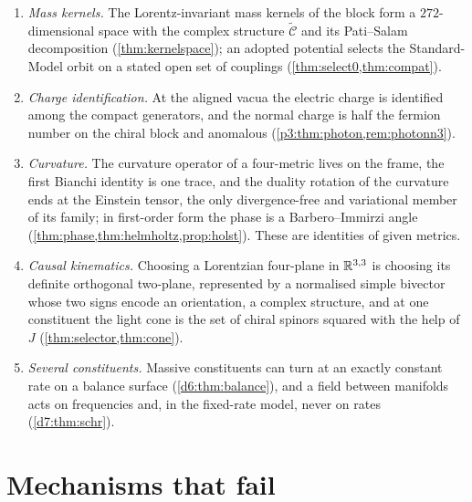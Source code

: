 \begin{enumerate}[label=(\arabic*),leftmargin=2.2em]
\item \emph{Mass kernels.} The Lorentz-invariant mass kernels of the block form a $272$-dimensional space with the complex structure $\widetilde{\mathcal C}$
and its Pati--Salam decomposition (\cref{thm:kernelspace}); an adopted potential selects the Standard-Model orbit on a stated open set of couplings
(\cref{thm:select0,thm:compat}).
\item \emph{Charge identification.} At the aligned vacua the electric charge is identified among the compact generators, and the normal charge is
half the fermion number on the chiral block and anomalous (\cref{p3:thm:photon,rem:photonn3}).
\item \emph{Curvature.} The curvature operator of a four-metric lives on the frame, the first Bianchi identity is one trace, and the duality
rotation of the curvature ends at the Einstein tensor, the only divergence-free and variational member of its family; in first-order form the
phase is a Barbero--Immirzi angle (\cref{thm:phase,thm:helmholtz,prop:holst}). These are identities of given metrics.
\item \emph{Causal kinematics.} Choosing a Lorentzian four-plane in $\mathbb{R}^{3,3}$ is choosing its definite orthogonal two-plane, represented by a
normalised simple bivector whose two signs encode an orientation, a complex structure, and at one constituent the light
cone is the set of chiral spinors squared with the help of $J$ (\cref{thm:selector,thm:cone}).
\item \emph{Several constituents.} Massive constituents can turn at an exactly constant rate on a balance surface (\cref{d6:thm:balance}), and a
field between manifolds acts on frequencies and, in the fixed-rate model, never on rates (\cref{d7:thm:schr}).
\end{enumerate}

\section{Mechanisms that fail}
\label{sec:failed}

